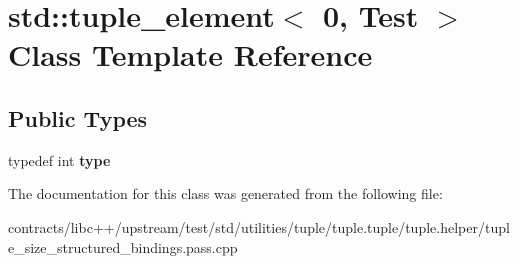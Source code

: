 \hypertarget{classstd_1_1tuple__element_3_010_00_01_test_01_4}{}\section{std\+:\+:tuple\+\_\+element$<$ 0, Test $>$ Class Template Reference}
\label{classstd_1_1tuple__element_3_010_00_01_test_01_4}
\subsection*{Public Types}
\begin{DoxyCompactItemize}
\item 
\mbox{\label{classstd_1_1tuple__element_3_010_00_01_test_01_4_a794b9666622d811eb6386fc35b460c84}} 
typedef int {\bfseries type}
\end{DoxyCompactItemize}


The documentation for this class was generated from the following file\+:\begin{DoxyCompactItemize}
\item 
contracts/libc++/upstream/test/std/utilities/tuple/tuple.\+tuple/tuple.\+helper/tuple\+\_\+size\+\_\+structured\+\_\+bindings.\+pass.\+cpp\end{DoxyCompactItemize}
